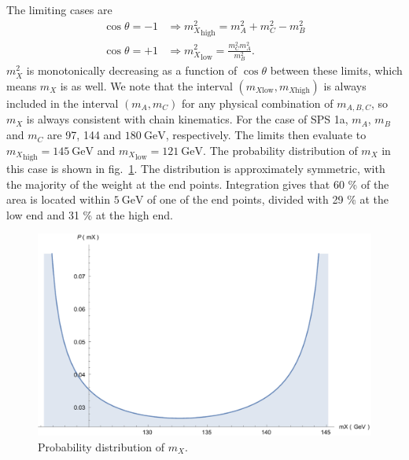 \documentclass[twoside,english]{uiofysmaster}
\begin{document}
The limiting cases are
\begin{align}
	\cos\theta = -1 &\Rightarrow {m_X^2}_\mathrm{high} = m_A^2 + m_C^2 - m_B^2\\
	\cos\theta = +1 &\Rightarrow {m_X^2}_\mathrm{low} = \frac{m_C^2 m_A^2}{m_B^2}.\nonumber
\end{align}
$m_X^2$ is monotonically decreasing as a function of $\cos\theta$ between these limits, which means $m_X$ is as well. We note that the interval $(m_{X\mathrm{low}},m_{X\mathrm{high}})$ is always included in the interval $(m_A, m_C)$ for any physical combination of $m_{A,B,C}$, so $m_X$ is always consistent with chain kinematics. For the case of SPS 1a, $m_A$, $m_B$ and $m_C$ are 97, 144 and $180~\mathrm{GeV}$, respectively. The limits then evaluate to ${m_X}_\mathrm{high} = 145 ~\mathrm{GeV}$ and ${m_X}_\mathrm{low} = 121 ~\mathrm{GeV}$. The probability distribution of $m_X$ in this case is shown in fig.\ \ref{fig:mX-dist}. 
The distribution is approximately symmetric, with the majority of the weight at the end points. Integration gives that 60 \% of the area is located within $5~\mathrm{GeV}$ of one of the end points, divided with 29 \% at the low end and 31 \% at the high end.
\begin{figure}[hbt]
\centering
\includegraphics[scale=0.6]{figures/appendix/mX-distribution.pdf}
\caption{Probability distribution of $m_X$.}
\label{fig:mX-dist}
\end{figure}








\end{document}
